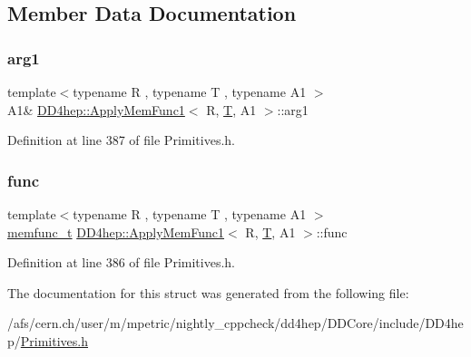 \subsection{Member Data Documentation}
\hypertarget{struct_d_d4hep_1_1_apply_mem_func1_aa1ef32d2750d2c3a55881e9198ba78d2}{}\label{struct_d_d4hep_1_1_apply_mem_func1_aa1ef32d2750d2c3a55881e9198ba78d2} 
\subsubsection{\texorpdfstring{arg1}{arg1}}
{\footnotesize\ttfamily template$<$typename R , typename T , typename A1 $>$ \\
A1\& \hyperlink{struct_d_d4hep_1_1_apply_mem_func1}{D\+D4hep\+::\+Apply\+Mem\+Func1}$<$ R, \hyperlink{class_t}{T}, A1 $>$\+::arg1}



Definition at line 387 of file Primitives.\+h.

\hypertarget{struct_d_d4hep_1_1_apply_mem_func1_ac13bb60da947716106d65b273854ef73}{}\label{struct_d_d4hep_1_1_apply_mem_func1_ac13bb60da947716106d65b273854ef73} 
\subsubsection{\texorpdfstring{func}{func}}
{\footnotesize\ttfamily template$<$typename R , typename T , typename A1 $>$ \\
\hyperlink{struct_d_d4hep_1_1_apply_mem_func1_a8d2f05f9fd623eebfcfa252c8102783c}{memfunc\+\_\+t} \hyperlink{struct_d_d4hep_1_1_apply_mem_func1}{D\+D4hep\+::\+Apply\+Mem\+Func1}$<$ R, \hyperlink{class_t}{T}, A1 $>$\+::func}



Definition at line 386 of file Primitives.\+h.



The documentation for this struct was generated from the following file\+:\begin{DoxyCompactItemize}
\item 
/afs/cern.\+ch/user/m/mpetric/nightly\+\_\+cppcheck/dd4hep/\+D\+D\+Core/include/\+D\+D4hep/\hyperlink{_primitives_8h}{Primitives.\+h}\end{DoxyCompactItemize}

